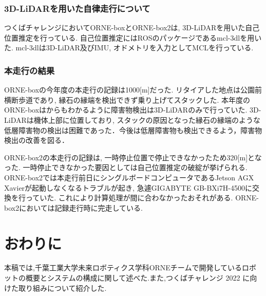 \documentclass[uplatex, twocolumn, 9pt]{jsproceedings}
\begin{document}
\subsubsection{3D-LiDARを用いた自律走行について}
つくばチャレンジにおいてORNE-boxとORNE-box2は, 3D-LiDARを用いた自己位置推定を行っている. 自己位置推定にはROSのパッケージであるmcl-3dl\cite{mcl-3dl}を用いた. mcl-3dlは3D-LiDAR及びIMU, オドメトリを入力としてMCLを行っている.

\subsubsection{本走行の結果}
ORNE-boxの今年度の本走行の記録は1000[m]だった. リタイアした地点は公園前横断歩道であり, 縁石の縁端を検出できず乗り上げてスタックした. 本年度のORNE-boxはからもわかるように障害物検出は3D-LiDARのみで行っていた. 3D-LiDARは機体上部に位置しており, スタックの原因となった縁石の縁端のような低層障害物の検出は困難であった．今後は低層障害物も検出できるよう，障害物検出の改善を図る．\par
ORNE-box2の本走行の記録は, 一時停止位置で停止できなかったため320[m]となった. 一時停止できなかった要因としては自己位置推定の破綻が挙げられる. ORNE-box2では本走行前日にシングルボードコンピュータであるJetson AGX Xavierが起動しなくなるトラブルが起き, 急遽GIGABYTE GB-BXi7H-4500に交換を行っていた. これにより計算処理が間に合わなかったおそれがある. ORNE-box2においては記録走行時に完走している. 

\section{おわりに}
本稿では,千葉工業大学未来ロボティクス学科ORNEチームで開発しているロボットの概要とシステムの構成に関して述べた.また,つくばチャレンジ 2022 に向けた取り組みについて紹介した.

\end{document}
